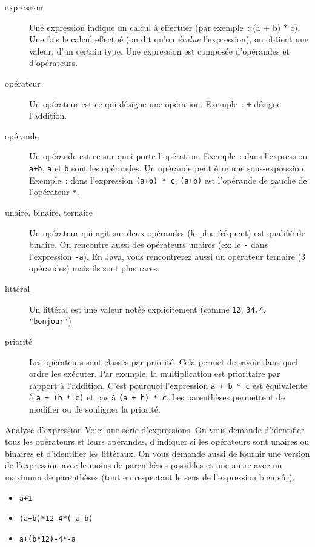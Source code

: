			\begin{description}
			\item[expression]
				Une expression indique un calcul à effectuer
				(par exemple~: (a + b) * c).
				Une fois le calcul effectué
				(on dit qu’on \emph{évalue} l’expression), 
				on obtient une valeur, d’un certain type.
				Une expression est composée d’opérandes et d’opérateurs.
			\item[opérateur]
				Un opérateur est ce qui désigne une opération.
				Exemple~: \Verb_+_ désigne l’addition.
			\item[opérande]
				Un opérande est ce sur quoi porte l’opération.
				Exemple~: dans l’expression \Verb_a+b_, 
				\Verb_a_ et \Verb_b_ sont les opérandes.
				Un opérande peut être une sous-expression.
				Exemple~: dans l’expression \Verb_(a+b) * c_, 
				\Verb_(a+b)_ est l’opérande 
				de gauche de l’opérateur \Verb_*_.
			\item[unaire, binaire, ternaire]
				Un opérateur qui agit sur deux opérandes (le plus fréquent)
				est qualifié de binaire. 
				On rencontre aussi des opérateurs unaires (ex: le \Verb_-_ 
				dans l’expression \Verb_-a_).
				En Java, vous rencontrerez aussi un opérateur ternaire (3 opérandes)
				mais ils sont plus rares.
			\item[littéral]
				Un littéral est une valeur notée explicitement 
				(comme \Verb_12_, \Verb_34.4_, \Verb_"bonjour"_)
			\item[priorité]
				Les opérateurs sont classés par priorité. 
				Cela permet de savoir dans quel ordre les exécuter.
				Par exemple, la multiplication est prioritaire par rapport à l’addition.
				C’est pourquoi l’expression \Verb_a + b * c_ 
				est équivalente à \Verb_a + (b * c)_ et pas à \Verb_(a + b) * c_.
				Les parenthèses permettent de modifier ou de souligner la priorité.
			\end{description}
			
			\begin{Exercice}{Analyse d’expression}
				Voici une série d’expressions.
				On vous demande d’identifier tous les opérateurs
				et leurs opérandes, 
				d’indiquer si les opérateurs sont unaires ou binaires
				et d’identifier les littéraux.
				On vous demande aussi de fournir une version de l’expression
				avec le moins de parenthèses possibles et 
				une autre avec un maximum de parenthèses
				(tout en respectant le sens de l’expression bien sûr).
				\begin{itemize}
				\item \Verb_a+1_
				\item \Verb_(a+b)*12-4*(-a-b)_ 
				\item \Verb_a+(b*12)-4*-a_ 
				\end{itemize}
			\end{Exercice}
			

